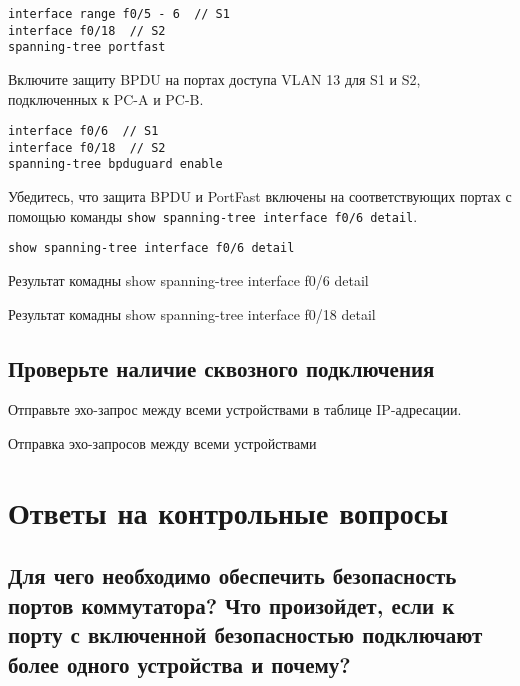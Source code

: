\begin{verbatim}
interface range f0/5 - 6  // S1
interface f0/18  // S2
spanning-tree portfast
\end{verbatim}

Включите защиту BPDU на портах доступа VLAN 13 для S1 и S2,
подключенных к PC-A и PC-B.

\begin{verbatim}
interface f0/6  // S1
interface f0/18  // S2
spanning-tree bpduguard enable
\end{verbatim}

Убедитесь, что защита BPDU и PortFast включены на соответствующих портах
с помощью команды \texttt{show spanning-tree interface f0/6 detail}.

\begin{verbatim}
show spanning-tree interface f0/6 detail
\end{verbatim}

\begin{image}
	\caption{Результат комадны show spanning-tree interface f0/6 detail}
\end{image}

\begin{image}
	\caption{Результат комадны show spanning-tree interface f0/18 detail}
\end{image}



\subsection{Проверьте наличие сквозного подключения}

Отправьте эхо-запрос между всеми устройствами в таблице IP-адресации. 

\begin{image}
	\caption{Отправка эхо-запросов между всеми устройствами}
\end{image}

\section{Ответы на контрольные вопросы}

\subsection{Для чего необходимо обеспечить безопасность портов 
коммутатора? Что произойдет, если к порту с включенной 
безопасностью подключают более одного устройства и почему?}

